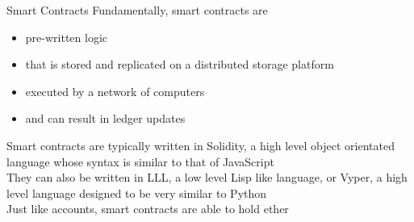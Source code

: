 \documentclass[10pt]{beamer}
\begin{document}



\begin{frame}{Smart Contracts}
	Fundamentally, smart contracts are
	\begin{itemize}
		\item pre-written logic
		\item that is stored and replicated on a distributed storage platform
		\item executed by a network of computers
		\item and can result in ledger updates
	\end{itemize}
	Smart contracts are typically written in Solidity, a high level object orientated language whose syntax is similar to that of JavaScript \\ \vspace{3mm}
	They can also be written in LLL, a low level Lisp like language, or Vyper, a high level language designed to be very similar to Python \\ \vspace{3mm}
	Just like accounts, smart contracts are able to hold ether
\end{frame}

\end{document}
